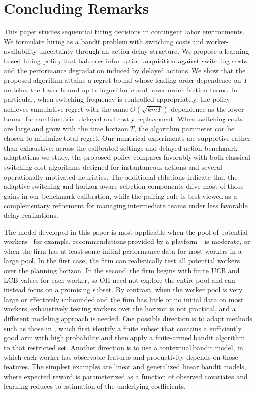 \documentclass[opre,blindrev]{informs3}
\begin{document}
\section{Concluding Remarks}\label{sec:conclusion}
This paper studies sequential hiring decisions in contingent labor environments. We formulate hiring as a bandit problem with switching costs and worker-availability uncertainty through an action-delay structure. We propose a learning-based hiring policy that balances information acquisition against switching costs and the performance degradation induced by delayed actions. We show that the proposed algorithm attains a regret bound whose leading-order dependence on \(T\) matches the lower bound up to logarithmic and lower-order friction terms. In particular, when switching frequency is controlled appropriately, the policy achieves cumulative regret with the same \(\tilde{O}(\sqrt{kmT})\) dependence as the lower bound for combinatorial delayed and costly replacement. When switching costs are large and grow with the time horizon \(T\), the algorithm parameter can be chosen to minimize total regret. Our numerical experiments are supportive rather than exhaustive: across the calibrated settings and delayed-action benchmark adaptations we study, the proposed policy compares favorably with both classical switching-cost algorithms designed for instantaneous actions and several operationally motivated heuristics. The additional ablations indicate that the adaptive switching and horizon-aware selection components drive most of those gains in our benchmark calibration, while the pairing rule is best viewed as a complementary refinement for managing intermediate teams under less favorable delay realizations.

The model developed in this paper is most applicable when the pool of potential workers---for example, recommendations provided by a platform---is moderate, or when the firm has at least some initial performance data for most workers in a large pool. In the first case, the firm can realistically test all potential workers over the planning horizon. In the second, the firm begins with finite UCB and LCB values for each worker, so \textsc{OH} need not explore the entire pool and can instead focus on a promising subset. By contrast, when the worker pool is very large or effectively unbounded and the firm has little or no initial data on most workers, exhaustively testing workers over the horizon is not practical, and a different modeling approach is needed. One possible direction is to adapt methods such as those in \cite{wang2008algorithms}, which first identify a finite subset that contains a sufficiently good arm with high probability and then apply a finite-armed bandit algorithm to that restricted set. Another direction is to use a contextual bandit model, in which each worker has observable features and productivity depends on those features. The simplest examples are linear and generalized linear bandit models, where expected reward is parameterized as a function of observed covariates and learning reduces to estimation of the underlying coefficients.
\end{document}
